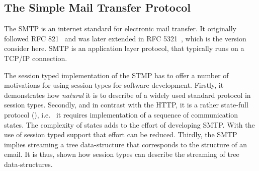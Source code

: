 
\subsection{The Simple Mail Transfer Protocol}

The SMTP is an internet standard for electronic
mail transfer. It originally followed
RFC 821~\cite{SMTP-rfc} and was later extended
in RFC 5321~\cite{ESMTP-rfc}, which is the version consider here.
SMTP is an application layer protocol, that typically runs on
a TCP/IP connection.

The session typed implementation of the STMP has to offer
a number of motivations for using session types for software
development.
Firstly, it demonstrates how {\em natural} it is
to describe of a widely used standard protocol in session types.
Secondly, and in contrast with the HTTP, it is
a rather state-full protocol (),
i.e.~ it requires implementation of a sequence of communication states.
The complexity of states adds to the effort of
developing SMTP. With the use of session typed
support that effort can be reduced.
Thirdly, the SMTP implies streaming a tree
data-structure that corresponds to the structure
of an email.
It is thus, shown how session types can describe
the streaming of tree data-structures.


%
%



